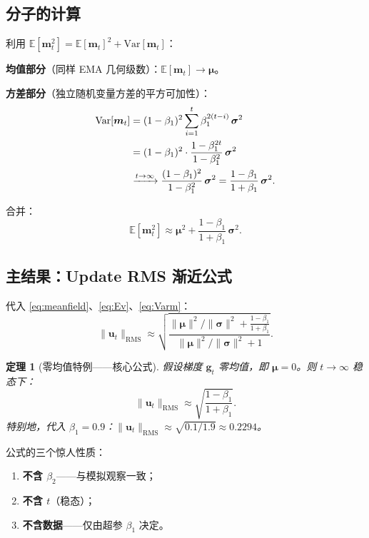 \documentclass[11pt,a4paper]{ctexart}
\newtheorem{theorem}{定理}[section]
\theoremstyle{definition}
\theoremstyle{remark}
\newcommand{\RMS}{\mathrm{RMS}}
\newcommand{\E}{\mathbb{E}}
\newcommand{\Var}{\mathrm{Var}}
\begin{document}
\subsection{分子的计算}
 
利用 $\E[\bm{m}_t^2] = \E[\bm{m}_t]^2 + \Var[\bm{m}_t]$：
 
\textbf{均值部分}（同样 EMA 几何级数）：$\E[\bm{m}_t] \to \bm{\mu}$。
 
\textbf{方差部分}（独立随机变量方差的平方可加性）：
\begin{align}
\Var[\bm{m}_t] 
&= (1-\beta_1)^2 \sum_{i=1}^{t} \beta_1^{2(t-i)}\, \bm{\sigma}^2 \notag \\
&= (1-\beta_1)^2 \cdot \frac{1 - \beta_1^{2t}}{1 - \beta_1^2}\, \bm{\sigma}^2 \notag \\
&\xrightarrow{t \to \infty} \frac{(1-\beta_1)^2}{1-\beta_1^2}\, \bm{\sigma}^2
= \frac{1-\beta_1}{1+\beta_1}\, \bm{\sigma}^2.
\label{eq:Varm}
\end{align}
 
合并：
\begin{equation}
\E[\bm{m}_t^2] \approx \bm{\mu}^2 + \frac{1-\beta_1}{1+\beta_1}\, \bm{\sigma}^2.
\end{equation}
 
\subsection{主结果：Update RMS 渐近公式}
 
代入 \eqref{eq:meanfield}、\eqref{eq:Ev}、\eqref{eq:Varm}：
\begin{equation}
\boxed{\;
\|\bm{u}_t\|_\RMS \approx \sqrt{\frac{\|\bm{\mu}\|^2/\|\bm{\sigma}\|^2 + \frac{1-\beta_1}{1+\beta_1}}{\|\bm{\mu}\|^2/\|\bm{\sigma}\|^2 + 1}}.
\;}
\label{eq:urms-general}
\end{equation}
 
\begin{theorem}[零均值特例——核心公式]
假设梯度 $\bm{g}_t$ 零均值，即 $\bm{\mu} = 0$。则 $t \to \infty$ 稳态下：
\begin{equation}
\|\bm{u}_t\|_\RMS \approx \sqrt{\frac{1-\beta_1}{1+\beta_1}}.
\end{equation}
特别地，代入 $\beta_1 = 0.9$：$\|\bm{u}_t\|_\RMS \approx \sqrt{0.1/1.9} \approx 0.2294$。
\end{theorem}
 
\begin{keyinsight}
公式的三个惊人性质：
\begin{enumerate}
    \item \textbf{不含 $\beta_2$}——与模拟观察一致；
    \item \textbf{不含 $t$}（稳态）；
    \item \textbf{不含数据}——仅由超参 $\beta_1$ 决定。
\end{enumerate}
\end{keyinsight}
 
\end{document}
